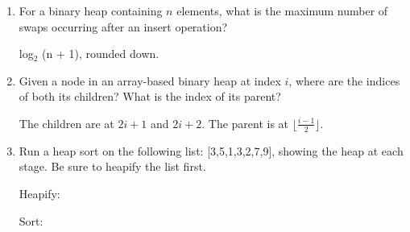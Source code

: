\documentclass[11pt]{article}
\newenvironment{answer}{\large\lstset{basicstyle=\tiny\ttfamily}\color{white}}{}
\newenvironment{answer}{\large\lstset{basicstyle=\large\ttfamily}\color{red}}{}
\begin{document}
\begin{enumerate}
\item For a binary heap containing $n$ elements, what is the maximum number of
      swaps occurring after an insert operation?

    \begin{answer}
        log$_{\textrm{2}}$ (n + 1), rounded down.
    \end{answer}

\item Given a node in an array-based binary heap at index $i$, where are the
      indices of both its children? What is the index of its parent?

    \begin{answer}
    The children are at $2i+1$ and $2i+2$. The parent is at
    $\lfloor\frac{i-1}{2}\rfloor$.

    \end{answer}

\item Run a heap sort on the following list: [3,5,1,3,2,7,9], showing the heap
      at each stage. Be sure to heapify the list first.

    \begin{answer}
        Heapify:  \newline
        	[\underline{3}, 5, 1, 3, 2, 7, 9]       \newline 
    	
    	Sort:      \newline
    		[\underline{9}, 7, 5, 3, 3, 2, 1] \newline
    		[9, 7, 5, 3, 3, 2, 1] \newline
    \end{answer}


\end{enumerate}
\end{document}
